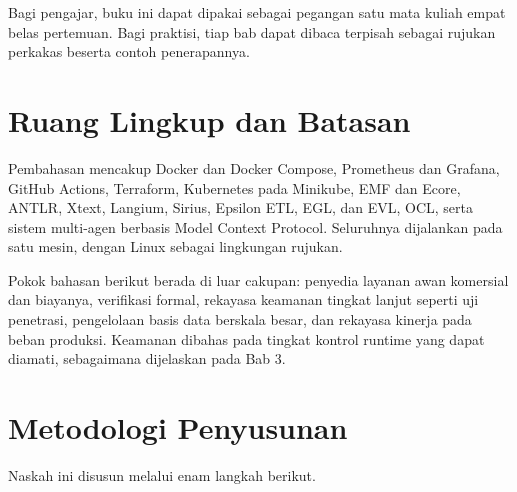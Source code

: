 Bagi pengajar, buku ini dapat dipakai sebagai pegangan satu mata kuliah empat
belas pertemuan. Bagi praktisi, tiap bab dapat dibaca terpisah sebagai rujukan
perkakas beserta contoh penerapannya.

\section*{Ruang Lingkup dan Batasan}

Pembahasan mencakup Docker dan Docker Compose, Prometheus dan Grafana, GitHub
Actions, Terraform, Kubernetes pada Minikube, EMF dan Ecore, ANTLR, Xtext,
Langium, Sirius, Epsilon ETL, EGL, dan EVL, OCL, serta sistem multi-agen berbasis
Model Context Protocol. Seluruhnya dijalankan pada satu mesin, dengan Linux
sebagai lingkungan rujukan.

Pokok bahasan berikut berada di luar cakupan: penyedia layanan awan komersial dan
biayanya, verifikasi formal, rekayasa keamanan tingkat lanjut seperti uji
penetrasi, pengelolaan basis data berskala besar, dan rekayasa kinerja pada
beban produksi. Keamanan dibahas pada tingkat kontrol runtime yang dapat diamati,
sebagaimana dijelaskan pada Bab 3.

\section*{Metodologi Penyusunan}

Naskah ini disusun melalui enam langkah berikut.

